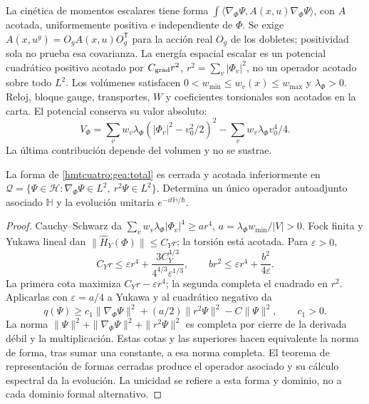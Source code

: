 La cinética de momentos escalares tiene forma
$\int\langle\nabla_\Phi\Psi,A(x,u)\nabla_\Phi\Psi\rangle$,
con $A$ acotada, uniformemente positiva e independiente de $\Phi$.
Se exige $A(x,u^g)=O_gA(x,u)O_g^{\mathsf T}$ para la acción real
$O_g$ de los dobletes; positividad sola no prueba esa covarianza.
La energía espacial escalar es un potencial cuadrático positivo
acotado por $C_{\rm grad}r^2$, $r^2=\sum_v|\Phi_v|^2$,
no un operador acotado sobre todo $L^2$.
Los volúmenes satisfacen
$0<w_{\min}\leq w_v(x)\leq w_{\max}$ y $\lambda_\Phi>0$.
Reloj, bloque gauge, transportes, $W$ y coeficientes torsionales
son acotados en la carta. El potencial conserva su valor absoluto:
\begin{equation}
V_\Phi=\sum_vw_v\lambda_\Phi(|\Phi_v|^2-v_0^2/2)^2
-\sum_vw_v\lambda_\Phi v_0^4/4.
\label{hmtcuatro:gea:potencial}
\end{equation}
La última contribución depende del volumen y no se sustrae.

\begin{theorem}
\label{hmtcuatro:gea:forma}
La forma de \eqref{hmtcuatro:gea:total} es cerrada y acotada
inferiormente en
$\mathcal Q=\{\Psi\in\mathscr H:\nabla_\Phi\Psi\in L^2,\
r^2\Psi\in L^2\}$.
Determina un único operador autoadjunto asociado $\mathbb H$
y la evolución unitaria $e^{-it\mathbb H/\hbar}$.
\end{theorem}
\begin{proof}
Cauchy--Schwarz da
$\sum_vw_v\lambda_\Phi|\Phi_v|^4\geq ar^4$,
$a=\lambda_\Phi w_{\min}/|V|>0$.
Fock finita y Yukawa lineal dan
$\|\widehat H_Y(\Phi)\|\leq C_Yr$; la torsión está acotada.
Para $\varepsilon>0$,
\[
C_Yr\leq\varepsilon r^4+
\frac{3C_Y^{4/3}}{4^{4/3}\varepsilon^{1/3}},\qquad
br^2\leq\varepsilon r^4+\frac{b^2}{4\varepsilon}.
\]
La primera cota maximiza $C_Yr-\varepsilon r^4$; la segunda
completa el cuadrado en $r^2$. Aplicarlas con $\varepsilon=a/4$
a Yukawa y al cuadrático negativo da
\[
q(\Psi)\geq c_1\|\nabla_\Phi\Psi\|^2+
(a/2)\|r^2\Psi\|^2-C\|\Psi\|^2,\qquad c_1>0.
\]
La norma
$\|\Psi\|^2+\|\nabla_\Phi\Psi\|^2+\|r^2\Psi\|^2$
es completa por cierre de la derivada débil y la multiplicación.
Estas cotas y las superiores hacen equivalente la norma de forma,
tras sumar una constante, a esa norma completa.
El teorema de representación de formas cerradas produce el operador
asociado y su cálculo espectral da la evolución.
La unicidad se refiere a esta forma y dominio, no a cada dominio
formal alternativo.
\end{proof}

